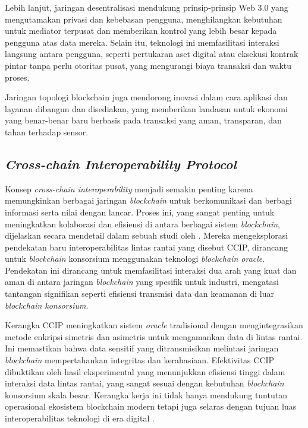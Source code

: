 Lebih lanjut, jaringan desentralisasi mendukung prinsip-prinsip Web 3.0 yang mengutamakan privasi dan kebebasan pengguna, menghilangkan kebutuhan untuk mediator terpusat dan memberikan kontrol yang lebih besar kepada pengguna atas data mereka. Selain itu, teknologi ini memfasilitasi interaksi langsung antara pengguna, seperti pertukaran aset digital atau eksekusi kontrak pintar tanpa perlu otoritas pusat, yang mengurangi biaya transaksi dan waktu proses.

Jaringan topologi blockchain juga mendorong inovasi dalam cara aplikasi dan layanan dibangun dan disediakan, yang memberikan landasan untuk ekonomi yang benar-benar baru berbasis pada transaksi yang aman, transparan, dan tahan terhadap sensor. \cite{8441990}

\subsection{\emph{Cross-chain Interoperability Protocol}}
Konsep \emph{cross-chain interoperability} menjadi semakin penting karena memungkinkan berbagai jaringan \emph{blockchain} untuk berkomunikasi dan berbagi informasi serta nilai dengan lancar. Proses ini, yang sangat penting untuk meningkatkan kolaborasi dan efisiensi di antara berbagai sistem \emph{blockchain}, dijelaskan secara mendetail dalam sebuah studi oleh \cite{s23041864}. Mereka mengeksplorasi pendekatan baru interoperabilitas lintas rantai yang disebut CCIP, dirancang untuk \emph{blockchain} konsorsium menggunakan teknologi \emph{blockchain oracle}. Pendekatan ini dirancang untuk memfasilitasi interaksi dua arah yang kuat dan aman di antara jaringan \emph{blockchain} yang spesifik untuk industri, mengatasi tantangan signifikan seperti efisiensi transmisi data dan keamanan di luar \emph{blockchain konsorsium}.

Kerangka CCIP meningkatkan sistem \emph{oracle} tradisional dengan mengintegrasikan metode enkripsi simetris dan asimetris untuk mengamankan data di lintas rantai. Ini memastikan bahwa data sensitif yang ditransmisikan melintasi jaringan \emph{blockchain} mempertahankan integritas dan kerahasiaan. Efektivitas CCIP dibuktikan oleh hasil eksperimental yang menunjukkan efisiensi tinggi dalam interaksi data lintas rantai, yang sangat sesuai dengan kebutuhan \emph{blockchain} konsorsium skala besar. Kerangka kerja ini tidak hanya mendukung tuntutan operasional ekosistem blockchain modern tetapi juga selaras dengan tujuan luas interoperabilitas teknologi di era digital \cite{Pillai_Biswas_Muthukkumarasamy_2020}.

